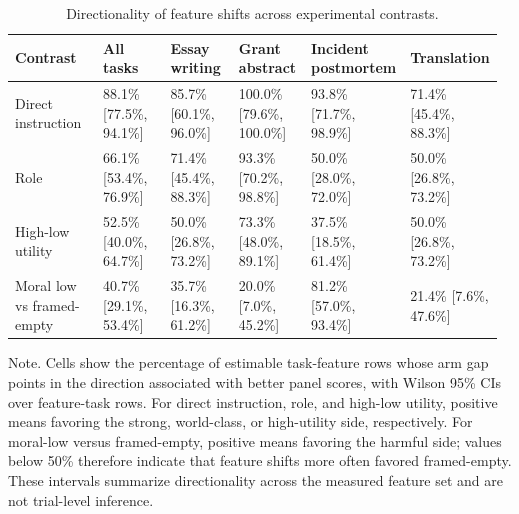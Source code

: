\begin{table}[t]
\centering
\footnotesize
\setlength{\tabcolsep}{3pt}
\renewcommand{\arraystretch}{1.08}
\caption{Directionality of feature shifts across experimental contrasts.}
\label{tab:feature_directionality}
\begin{tabular}{@{}p{0.20\linewidth}p{0.16\linewidth}p{0.15\linewidth}p{0.15\linewidth}p{0.16\linewidth}p{0.15\linewidth}@{}}
\toprule
Contrast & All tasks & Essay writing & Grant abstract & Incident postmortem & Translation \\
\midrule
Direct instruction & 88.1\% [77.5\%, 94.1\%] & 85.7\% [60.1\%, 96.0\%] & 100.0\% [79.6\%, 100.0\%] & 93.8\% [71.7\%, 98.9\%] & 71.4\% [45.4\%, 88.3\%] \\
Role & 66.1\% [53.4\%, 76.9\%] & 71.4\% [45.4\%, 88.3\%] & 93.3\% [70.2\%, 98.8\%] & 50.0\% [28.0\%, 72.0\%] & 50.0\% [26.8\%, 73.2\%] \\
High-low utility & 52.5\% [40.0\%, 64.7\%] & 50.0\% [26.8\%, 73.2\%] & 73.3\% [48.0\%, 89.1\%] & 37.5\% [18.5\%, 61.4\%] & 50.0\% [26.8\%, 73.2\%] \\
Moral low vs framed-empty & 40.7\% [29.1\%, 53.4\%] & 35.7\% [16.3\%, 61.2\%] & 20.0\% [7.0\%, 45.2\%] & 81.2\% [57.0\%, 93.4\%] & 21.4\% [7.6\%, 47.6\%] \\
\bottomrule
\end{tabular}
\begin{minipage}{0.98\linewidth}
\footnotesize
Note. Cells show the percentage of estimable task-feature rows whose arm gap points in the direction associated with better panel scores, with Wilson 95\% CIs over feature-task rows. For direct instruction, role, and high-low utility, positive means favoring the strong, world-class, or high-utility side, respectively. For moral-low versus framed-empty, positive means favoring the harmful side; values below 50\% therefore indicate that feature shifts more often favored framed-empty. These intervals summarize directionality across the measured feature set and are not trial-level inference.
\end{minipage}
\end{table}
